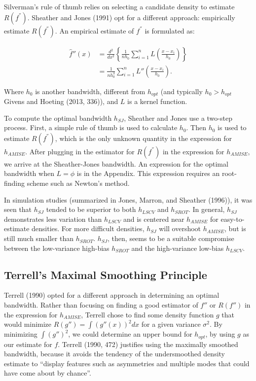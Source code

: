 \documentclass[]{article}
\begin{document}
Silverman's rule of thumb relies on selecting a candidate density to
estimate \(R(f^{''})\). Sheather and Jones (1991) opt for a different
approach: empirically estimate \(R(f^{''})\). An empirical estimate of
\(f^{''}\) is formulated as:

\[
\begin{aligned}
\hat{f}''(x) &= \frac{d^2}{dx^2} \left\{\frac{1}{nh_0} \sum_{i=1}^{n} L\left(\frac{x - x_i}{h_0}  \right) \right\}\\
&= \frac{1}{nh_0^3} \sum_{i=1}^{n} L''\left(\frac{x-x_i}{h_0} \right).
\end{aligned}
\]

Where \(h_0\) is another bandwidth, different from \(h_{opt}\) (and
typically \(h_0 > h_{opt}\) Givens and Hoeting (2013, 336)), and \(L\)
is a kernel function.

To compute the optimal bandwidth \(h_{SJ}\), Sheather and Jones use a
two-step process. First, a simple rule of thumb is used to calculate
\(h_0\). Then \(h_0\) is used to estimate \(R(f^{''})\), which is the
only unknown quantity in the expression for \(h_{AMISE}\). After
plugging in the estimator for \(R(f^{''})\) in the expression for
\(h_{AMISE}\), we arrive at the Sheather-Jones bandwidth. An expression
for the optimal bandwidth when \(L = \phi\) is in the Appendix. This
expression requires an root-finding scheme such as Newton's method.

In simulation studies (summarized in Jones, Marron, and Sheather
(1996)), it was seen that \(h_{SJ}\) tended to be superior to both
\(h_{LSCV}\) and \(h_{SROT}\). In general, \(h_{SJ}\) demonstrates less
variation than \(h_{LSCV}\) and is centered near \(h_{AMISE}\) for
easy-to-estimate densities. For more difficult densities, \(h_{SJ}\)
will overshoot \(h_{AMISE}\), but is still much smaller than
\(h_{SROT}\). \(h_{SJ}\), then, seems to be a suitable compromise
between the low-variance high-bias \(h_{SROT}\) and the high-variance
low-bias \(h_{LSCV}\).

\subsection{Terrell's Maximal Smoothing
Principle}\label{terrells-maximal-smoothing-principle}

Terrell (1990) opted for a different approach in determining an optimal
bandwidth. Rather than focusing on finding a good estimator of \(f''\)
or \(R(f'')\) in the expression for \(h_{AMISE}\), Terrell chose to find
some density function \(g\) that would minimize
\(R(g'') = \int (g '' (x))^2 dx\) for a given variance \(\sigma^2\). By
minimizing \(\int (g'')^2\), we could determine an upper bound for
\(h_{opt}\), by using \(g\) as our estimate for \(f\). Terrell (1990,
472) justifies using the maximally smoothed bandwidth, because it avoids
the tendency of the undersmoothed density estimate to ``display features
such as asymmetries and multiple modes that could have come about by
chance''.
\end{document}
